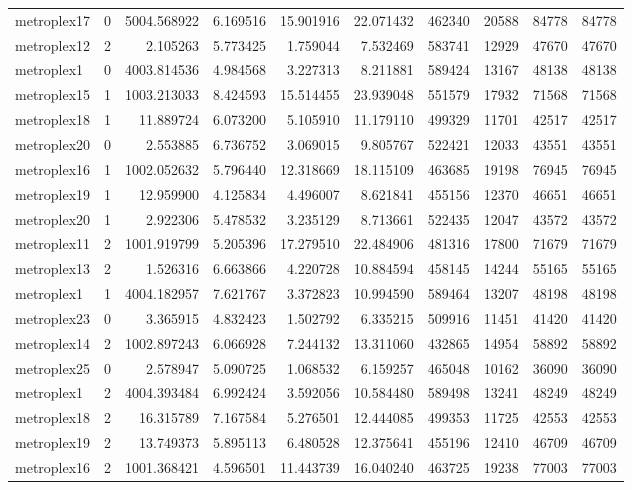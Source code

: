 \begin{longtable}{|l|r|r|r|r|r|r|r|r|r|}
metroplex17 & 0 & 5004.568922 & 6.169516 & 15.901916 & 22.071432 & 462340 & 20588 & 84778 & 84778 \\
metroplex12 & 2 & 2.105263 & 5.773425 & 1.759044 & 7.532469 & 583741 & 12929 & 47670 & 47670 \\
metroplex1 & 0 & 4003.814536 & 4.984568 & 3.227313 & 8.211881 & 589424 & 13167 & 48138 & 48138 \\
metroplex15 & 1 & 1003.213033 & 8.424593 & 15.514455 & 23.939048 & 551579 & 17932 & 71568 & 71568 \\
metroplex18 & 1 & 11.889724 & 6.073200 & 5.105910 & 11.179110 & 499329 & 11701 & 42517 & 42517 \\
metroplex20 & 0 & 2.553885 & 6.736752 & 3.069015 & 9.805767 & 522421 & 12033 & 43551 & 43551 \\
metroplex16 & 1 & 1002.052632 & 5.796440 & 12.318669 & 18.115109 & 463685 & 19198 & 76945 & 76945 \\
metroplex19 & 1 & 12.959900 & 4.125834 & 4.496007 & 8.621841 & 455156 & 12370 & 46651 & 46651 \\
metroplex20 & 1 & 2.922306 & 5.478532 & 3.235129 & 8.713661 & 522435 & 12047 & 43572 & 43572 \\
metroplex11 & 2 & 1001.919799 & 5.205396 & 17.279510 & 22.484906 & 481316 & 17800 & 71679 & 71679 \\
metroplex13 & 2 & 1.526316 & 6.663866 & 4.220728 & 10.884594 & 458145 & 14244 & 55165 & 55165 \\
metroplex1 & 1 & 4004.182957 & 7.621767 & 3.372823 & 10.994590 & 589464 & 13207 & 48198 & 48198 \\
metroplex23 & 0 & 3.365915 & 4.832423 & 1.502792 & 6.335215 & 509916 & 11451 & 41420 & 41420 \\
metroplex14 & 2 & 1002.897243 & 6.066928 & 7.244132 & 13.311060 & 432865 & 14954 & 58892 & 58892 \\
metroplex25 & 0 & 2.578947 & 5.090725 & 1.068532 & 6.159257 & 465048 & 10162 & 36090 & 36090 \\
metroplex1 & 2 & 4004.393484 & 6.992424 & 3.592056 & 10.584480 & 589498 & 13241 & 48249 & 48249 \\
metroplex18 & 2 & 16.315789 & 7.167584 & 5.276501 & 12.444085 & 499353 & 11725 & 42553 & 42553 \\
metroplex19 & 2 & 13.749373 & 5.895113 & 6.480528 & 12.375641 & 455196 & 12410 & 46709 & 46709 \\
metroplex16 & 2 & 1001.368421 & 4.596501 & 11.443739 & 16.040240 & 463725 & 19238 & 77003 & 77003 \\

\end{longtable}
